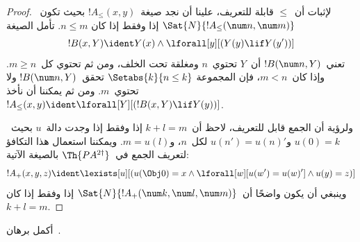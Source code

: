 \documentclass[../../../include/open-logic-section]{subfiles}
\begin{document}
\begin{proof}
لإثبات أن~$\le$ قابلة للتعريف، علينا أن نجد صيغة~$!A_\le(x, y)$
بحيث تكون~$\Sat{N}{!A_\le(\num n, \num m)}$ إذا وفقط إذا كان
$n \le m$. تأمل الصيغة
\[
!B(x, Y) \ident Y(x) \land \lforall[y][(Y(y) \lif Y(y'))]
\]
تعني~$!B(\num n,Y)$ أن~$Y$ تحتوي~$n$ ومغلقة تحت الخلف، ومن ثم
تحتوي كل~$m\ge n$. وإذا كان~$m<n$، فإن المجموعة
$\Setabs{k}{n\le k}$ تحقق~$!B(\num n,Y)$ ولا تحتوي~$m$.
ومن ثم يمكننا أن نأخذ~$!A_\le(x, y) \ident
\lforall[Y][(!B(x, Y) \lif Y(y))]$.

ولرؤية أن الجمع قابل للتعريف، لاحظ أن~$k+l=m$ إذا وفقط إذا وجدت
دالة~$u$ بحيث~$u(0)=k$ و$u(n')=u(n)'$ لكل~$n$، و$m = u(l)$.
ويمكننا استعمال هذا التكافؤ لتعريف الجمع في~$\Th{PA^{2\dagger}}$
بالصيغة الآتية:
\[
!A_+(x,y,z) \ident \lexists[u][(u(\Obj 0)=x \land \lforall[w][u(w')=u
 (w)'] \land u(y)=z)]
\] 
وينبغي أن يكون واضحًا أن~$\Sat{N}{!A_+(\num k, \num l, \num m)}$
إذا وفقط إذا كان~$k+l=m$.
\end{proof}

\begin{prob}
أكمل برهان~.
\end{prob}
\end{document}
